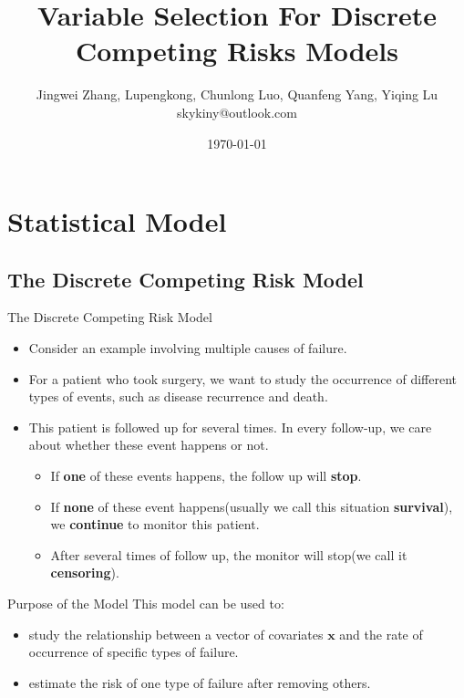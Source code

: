 \documentclass{beamer}
\title{Variable Selection For Discrete Competing Risks Models}
\date{\today}
\author{Jingwei Zhang, Lupengkong, 
    Chunlong Luo,
    Quanfeng Yang,
    Yiqing Lu
    \\
    {\ttfamily skykiny@outlook.com}
}
\begin{document}
    \maketitle
    
    
    \section{Statistical Model}
    \subsection{The Discrete Competing Risk Model}
    \begin{frame}{The Discrete Competing Risk Model}%
        \begin{itemize}
            \item Consider an example involving multiple causes of failure.
            \item For a patient who took surgery, we want to study the occurrence of different types of events, such as disease recurrence and death.
            \item This patient is followed up for several times. In every follow-up, we care about whether these event happens or not.
            \begin{itemize}
                \item If {\bf one} of these events happens, the follow up will {\bf stop}.
                \item If {\bf none} of these event happens(usually we call this situation {\bf survival}), we {\bf continue} to monitor this patient.
                \item After several times of follow up, the monitor will stop(we call it {\bf censoring}).
            \end{itemize}
        \end{itemize}
    \end{frame}
    
    \begin{frame}{Purpose of the Model}
        This model can be used to:
        \begin{itemize}
            \item study the relationship between a vector of covariates $\mathbf{x}$ and the rate of occurrence of specific types of failure.
            \item estimate the risk of one type of failure after removing others. 
        \end{itemize}
    \end{frame}
    
\end{document}
